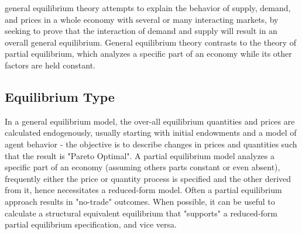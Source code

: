 \documentclass[11pt]{article}
\begin{document}
\begin{center}
\end{center}

general equilibrium theory attempts to explain the behavior of supply, demand, and prices in a whole economy with several or many interacting markets, by seeking to prove that the interaction of demand and supply will result in an overall general equilibrium. General equilibrium theory contrasts to the theory of partial equilibrium, which analyzes a specific part of an economy while its other factors are held constant.

\subsection{Equilibrium Type}
In a general equilibrium model, the over-all equilibrium quantities and prices are calculated endogenously, usually starting with initial endowments and a model of agent behavior - the objective is to describe changes in prices and quantities such that the result is "Pareto Optimal". A partial equilibrium model analyzes a specific part of an economy (assuming others parts constant or even absent), frequently either the price or quantity process is specified and the other derived from it, hence necessitates a reduced-form model.  Often a partial equilibrium approach results in "no-trade" outcomes.  When possible, it can be useful to calculate a structural equivalent equilibrium that "supports" a reduced-form partial equilibrium specification, and vice versa.  
\end{document}
